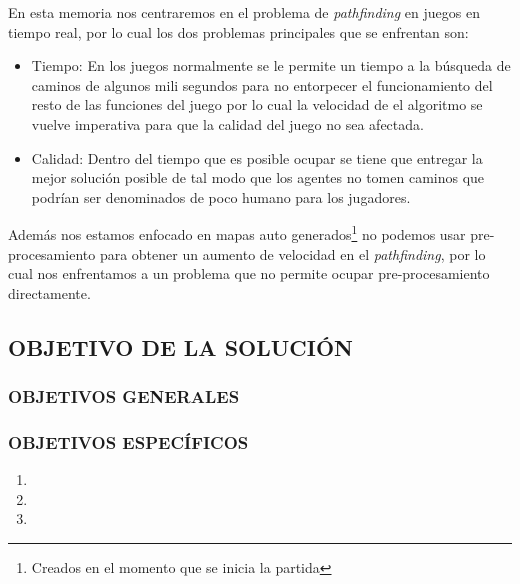 En esta memoria nos centraremos en el problema de \textit{pathfinding} en juegos en tiempo real, por lo cual los dos problemas principales que se enfrentan son:

\begin{itemize}

    \item Tiempo: En los juegos normalmente se le permite un tiempo a la búsqueda de caminos de algunos mili segundos para no entorpecer el funcionamiento del resto de las funciones del juego por lo cual la velocidad de el algoritmo se vuelve imperativa para que la calidad del juego no sea afectada.
    
    \item Calidad: Dentro del tiempo que es posible ocupar se tiene que entregar la mejor solución posible de tal modo que los agentes no tomen caminos que podrían ser denominados de poco humano para los jugadores.
    
\end{itemize}

Además nos estamos enfocado en mapas auto generados\footnote{Creados en el momento que se inicia la partida} no podemos usar pre-procesamiento para obtener un aumento de velocidad en el \textit{pathfinding}, por lo cual nos enfrentamos a un problema que no permite ocupar pre-procesamiento directamente. 

\subsection{OBJETIVO DE LA SOLUCIÓN}


\subsubsection{OBJETIVOS GENERALES}


\subsubsection{OBJETIVOS ESPECÍFICOS}


\begin{enumerate}
    \item  
    \item
    \item
\end{enumerate}